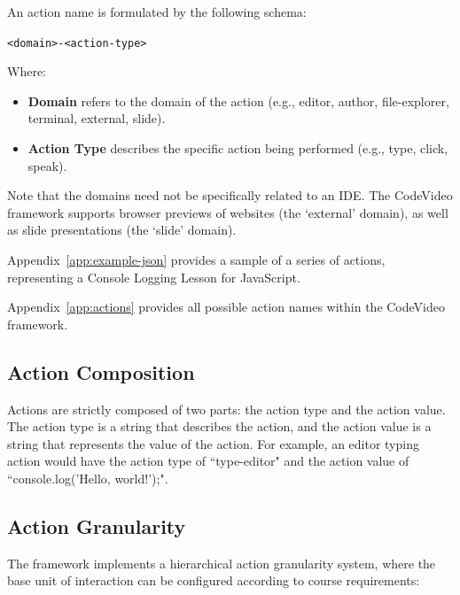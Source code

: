 \documentclass[11pt, a4paper]{article}
\begin{document}
An action name is formulated by the following schema:

\texttt{<domain>-<action-type>}

Where:

\begin{itemize}
    \item \textbf{Domain} refers to the domain of the action (e.g., editor, author, file-explorer, terminal, external, slide).
    \item \textbf{Action Type} describes the specific action being performed (e.g., type, click, speak).
\end{itemize}

Note that the domains need not be specifically related to an IDE. The CodeVideo framework supports browser previews of websites (the `external' domain), as well as slide presentations (the `slide' domain).

Appendix~\ref{app:example-json} provides a sample of a series of actions, representing a Console Logging Lesson for JavaScript.

Appendix~\ref{app:actions} provides all possible action names within the CodeVideo framework.



\subsection{Action Composition}

Actions are strictly composed of two parts: the action type and the action value. The action type is a string that describes the action, and the action value is a string that represents the value of the action. For example, an editor typing action would have the action type of ``type-editor" and the action value of ``console.log('Hello, world!');".

\subsection{Action Granularity}

The framework implements a hierarchical action granularity system, where the base unit of interaction can be configured according to course requirements:
\end{document}
